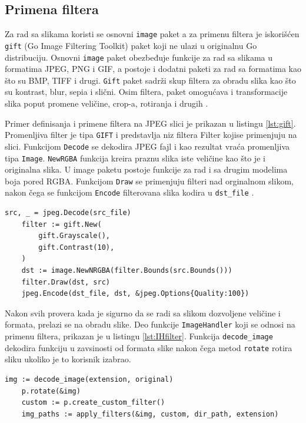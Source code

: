 \documentclass[12pt,oneside]{memoir}
\begin{document}
\subsection{Primena filtera}

Za rad sa slikama koristi se osnovni \texttt{image} paket a za primenu filtera je iskorišćen \texttt{gift} (Go Image Filtering Toolkit) paket\cite{gift} koji ne ulazi u originalnu Go distribuciju. Osnovni \texttt{image} paket obezbeđuje funkcije za rad sa slikama u formatima JPEG, PNG i GIF, a postoje i dodatni paketi za rad sa formatima kao što su BMP, TIFF i drugi\cite{image}. \texttt{Gift} paket sadrži skup filtera za obradu slika kao što su kontrast, blur, sepia i slični. Osim filtera, paket omogućava i transformacije slika poput promene veličine, crop-a, rotiranja i drugih \cite{gift}.

Primer definisanja i primene filtera na JPEG slici je prikazan u listingu \ref{lst:gift}. Promenljiva filter je tipa  \texttt{GIFT} i predstavlja niz filtera Filter kojise primenjuju na slici. Funkcijom  \texttt{Decode} se dekodira JPEG fajl i kao rezultat vraća promenljiva tipa  \texttt{Image}.  \texttt{NewRGBA} funkcija kreira praznu slika iste veličine kao što je i originalna slika. U image paketu postoje funkcije za rad i sa drugim modelima boja pored RGBA. Funkcijom  \texttt{Draw} se primenjuju filteri nad orginalnom slikom, nakon čega se funkcijom  \texttt{Encode} filterovana slika kodira u  \texttt{dst\_file} \cite{gift}.

\begin{center}
\begin{lstlisting}[caption=Definisanje i primena filtera,label={lst:gift},  backgroundcolor=\color{background}]
	src, _ = jpeg.Decode(src_file)
	filter := gift.New(
		gift.Grayscale(),
		gift.Contrast(10),
	)
	dst := image.NewNRGBA(filter.Bounds(src.Bounds()))
	filter.Draw(dst, src)
	jpeg.Encode(dst_file, dst, &jpeg.Options{Quality:100})
\end{lstlisting}
\end{center}

Nakon svih provera kada je sigurno da se radi sa slikom dozvoljene veličine i formata, prelazi se na obradu slike. Deo funkcije  \texttt{ImageHandler} koji se odnosi na primenu filtera, prikazan je u listingu \ref{lst:IHfilter}. Funkcija  \texttt{decode\_image} dekodira funkciju u zavsinosti od formata slike nakon čega metod  \texttt{rotate} rotira sliku ukoliko je to korisnik izabrao. 

\begin{center}
\begin{lstlisting}[caption=Primena filtera u funkciji ImageHandler,label={lst:IHfilter},  backgroundcolor=\color{background}]
	img := decode_image(extension, original)
	p.rotate(&img)
	custom := p.create_custom_filter()
	img_paths := apply_filters(&img, custom, dir_path, extension)
\end{lstlisting}
\end{center}
\end{document}

